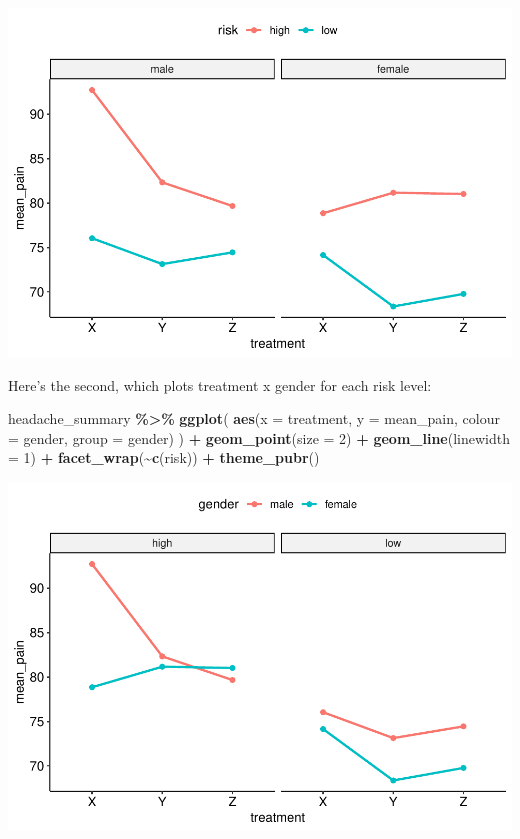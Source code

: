 \documentclass[
]{book}
\newenvironment{Shaded}{\begin{snugshade}}{\end{snugshade}}
\newcommand{\AttributeTok}[1]{\textcolor[rgb]{0.13,0.29,0.53}{#1}}
\newcommand{\DecValTok}[1]{\textcolor[rgb]{0.00,0.00,0.81}{#1}}
\newcommand{\FunctionTok}[1]{\textcolor[rgb]{0.13,0.29,0.53}{\textbf{#1}}}
\newcommand{\NormalTok}[1]{#1}
\newcommand{\SpecialCharTok}[1]{\textcolor[rgb]{0.81,0.36,0.00}{\textbf{#1}}}
\begin{document}
\includegraphics{_main_files/figure-latex/unnamed-chunk-250-1.pdf}

Here's the second, which plots treatment x gender for each risk level:

\begin{Shaded}
\begin{Highlighting}[]
\NormalTok{headache\_summary }\SpecialCharTok{\%\textgreater{}\%}
  \FunctionTok{ggplot}\NormalTok{(}
    \FunctionTok{aes}\NormalTok{(}\AttributeTok{x =}\NormalTok{ treatment, }\AttributeTok{y =}\NormalTok{ mean\_pain, }\AttributeTok{colour =}\NormalTok{ gender, }\AttributeTok{group =}\NormalTok{ gender)}
\NormalTok{  ) }\SpecialCharTok{+}
  \FunctionTok{geom\_point}\NormalTok{(}\AttributeTok{size =} \DecValTok{2}\NormalTok{) }\SpecialCharTok{+}
  \FunctionTok{geom\_line}\NormalTok{(}\AttributeTok{linewidth =} \DecValTok{1}\NormalTok{) }\SpecialCharTok{+}
  \FunctionTok{facet\_wrap}\NormalTok{(}\SpecialCharTok{\textasciitilde{}}\FunctionTok{c}\NormalTok{(risk)) }\SpecialCharTok{+}
  \FunctionTok{theme\_pubr}\NormalTok{()}
\end{Highlighting}
\end{Shaded}

\includegraphics{_main_files/figure-latex/unnamed-chunk-251-1.pdf}
\end{document}
